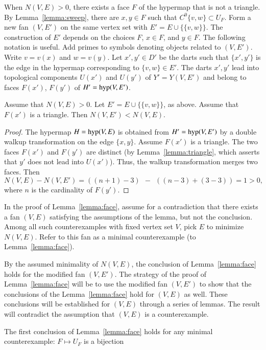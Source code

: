 When $N(V,E)>0$,  there exists a face $F$ of the hypermap that is not a triangle.  By Lemma~\ref{lemma:sweep}, there are $x,y\in F$ such that $C^0\{v,w\}\subset U_F$. Form a new fan $(V,E')$ on the same vertex set with
$E' = E\cup \{\{v,w\}\}$.   The construction of $E'$ depends on the choices $F$, $x\in F$, and $y\in F$.   The following notation is useful.  Add primes to symbols denoting objects related to $(V,E')$.  Write
$v=v(x)$ and $w=v(y)$.  Let $x',y'\in D'$ be the darts such that $\{x',y'\}$ is the edge in the hypermap corresponding to $\{v,w\}\in E'$.  The darts $x',y'$ lead into topological components $U(x')$ and $U(y')$ of $Y'=Y(V,E')$  and belong to faces $F(x')$, $F(y')$ of $H'={\operatorname{hyp}}(V,E')$.

\begin{lemma} 
Assume that $N(V,E)>0$.  Let $E'=E\cup \{\{v,w\}\}$, as above.  Assume that $F(x')$  is a triangle. Then $N(V,E')<N(V,E)$.
\end{lemma}


\begin{proof}    The hypermap $H={\operatorname{hyp}}(V,E)$ is obtained from $H'={\operatorname{hyp}}(V,E')$ by a double walkup transformation on the edge $\{x,y\}$.  Assume $F(x')$ is a triangle.  The two faces $F(x')$ and $F(y')$ are distinct (by Lemma~\ref{lemma:triangle}, which asserts that $y'$ does not lead into $U(x')$).  Thus, the walkup transformation merges two faces.   Then 
$$N(V,E) - N(V,E') = ((n+1)-3) ~~-~~ ((n-3) + (3-3)) = 1 >0,$$
where $n$ is the cardinality of $F(y')$.
\end{proof}

In the proof of Lemma~\ref{lemma:face},
assume for a contradiction that there exists a fan $(V,E)$ 
satisfying the assumptions of the lemma, but not the conclusion.
Among all such counterexamples with fixed vertex set $V$,  pick
$E$ to minimize  $N(V,E)$.  Refer to this fan as a minimal counterexample (to
Lemma~\ref{lemma:face}).  

By the assumed minimality of $N(V,E)$, the conclusion of Lemma~\ref{lemma:face} holds for the
modified fan $(V,E')$.  The strategy of the proof of Lemma~\ref{lemma:face} will
be to use the modified fan $(V,E')$ to show that the conclusions of the Lemma~\ref{lemma:face} hold for $(V,E)$ as well.   These conclusions will be established for $(V,E)$ through a series of lemmas.  The result will contradict the assumption that
$(V,E)$ is a counterexample.

\begin{lemma}
The first conclusion of Lemma~\ref{lemma:face} holds for any minimal counterexample:
$F\mapsto U_F$ is a bijection
\end{lemma}

